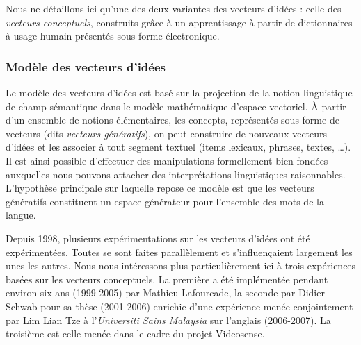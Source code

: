 {Nous ne détaillons ici qu'une des deux variantes des vecteurs d'idées :
celle des
\emph{vecteurs conceptuels}, construits grâce à un apprentissage à partir de dictionnaires à
usage humain présentés sous forme électronique. 

\subsubsection{Modèle des vecteurs d'idées}
\label{sec:Modele}

Le modèle des vecteurs d'idées est basé sur
la projection de la notion linguistique de 
champ sémantique dans le modèle mathématique 
d'espace vectoriel. À partir d'un ensemble de notions
élémentaires, les concepts, représentés sous forme de vecteurs (dits
\emph{vecteurs génératifs}), on peut construire de nouveaux vecteurs
d'idées et les associer à tout segment
textuel (items lexicaux, phrases, textes, \ldots). Il est ainsi
possible d'effectuer des manipulations formellement bien fondées
auxquelles nous pouvons attacher des interprétations linguistiques
raisonnables. L'hypothèse principale sur laquelle repose ce modèle est
que les vecteurs génératifs constituent un espace générateur pour
l'ensemble des mots de la langue.

Depuis 1998, plusieurs expérimentations sur les vecteurs
d'idées ont été expérimentées. Toutes se sont faites
parallèlement et s'influençaient largement les unes les autres.
Nous nous intéressons plus particulièrement ici à trois
expériences basées sur les
vecteurs conceptuels.  La première a été 
implémentée pendant environ six ans (1999-2005) par 
Mathieu Lafourcade, la seconde par Didier Schwab pour sa thèse (2001-2006) enrichie d'une expérience menée conjointement par Lim Lian Tze à l'\textit{Universiti Sains Malaysia} sur l'anglais (2006-2007). La troisième est celle menée dans le cadre du projet Videosense.

}
